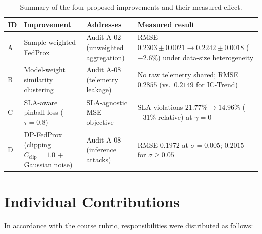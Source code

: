 \documentclass[11pt,a4paper]{article}
\begin{document}
\begin{table}[htbp]
\centering
\caption{Summary of the four proposed improvements and their measured effect.}
\label{tab:improvements_summary}
\small
\begin{tabularx}{\textwidth}{@{}l l Y Y@{}}
\toprule
\textbf{ID} & \textbf{Improvement} & \textbf{Addresses} & \textbf{Measured result} \\
\midrule
A & Sample-weighted FedProx & Audit A-02 (unweighted aggregation) & RMSE $0.2303 \pm 0.0021 \rightarrow 0.2242 \pm 0.0018$ ($-2.6\%$) under data-size heterogeneity \\[3pt]
B & Model-weight similarity clustering & Audit A-08 (telemetry leakage) & No raw telemetry shared; RMSE $0.2855$ (vs.\ $0.2149$ for IC-Trend) \\[3pt]
C & SLA-aware pinball loss ($\tau = 0.8$) & SLA-agnostic MSE objective & SLA violations $21.77\% \rightarrow 14.96\%$ ($-31\%$ relative) at $\gamma=0$ \\[3pt]
D & DP-FedProx (clipping $C_{\text{clip}}=1.0$ + Gaussian noise) & Audit A-08 (inference attacks) & RMSE $0.1972$ at $\sigma=0.005$; $0.2015$ for $\sigma \ge 0.05$ \\
\bottomrule
\end{tabularx}
\end{table}

\section{Individual Contributions}
In accordance with the course rubric, responsibilities were distributed as follows:
\end{document}

